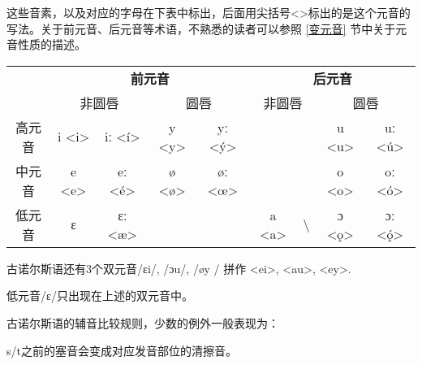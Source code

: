 
这些音素，以及对应的字母在下表中标出，后面用尖括号<>标出的是这个元音的写法。关于前元音、后元音等术语，不熟悉的读者可以参照 \ref{变元音} 节中关于元音性质的描述。

\begin{table}[H]
    \centering
    \begin{tabular}{@{}ccccccccc@{}}
        \toprule
               & \multicolumn{4}{c}{\textbf{前元音}} & \multicolumn{4}{c}{\textbf{后元音}}                                                                                                                                                                                 \\ \cmidrule(l){2-9}
               & \multicolumn{2}{c}{非圆唇}          & \multicolumn{2}{c}{圆唇}            & \multicolumn{2}{c}{非圆唇}   & \multicolumn{2}{c}{圆唇}                                                                                                                       \\ \cmidrule(l){2-9}
        高元音 & i \textless{}i\textgreater{}        & iː \textless{}í\textgreater{}       & y \textless{}y\textgreater{} & yː \textless{}ý\textgreater{} &                              &                  & u \textless{}u\textgreater{} & uː \textless{}ú\textgreater{} \\
        中元音 & e \textless{}e\textgreater{}        & eː \textless{}é\textgreater{}       & ø \textless{}ø\textgreater{} & øː \textless{}œ\textgreater{} &                              &                  & o \textless{}o\textgreater{} & oː \textless{}ó\textgreater{} \\
        低元音 & ɛ                                   & ɛː \textless{}æ\textgreater{}       &                              &                               & a \textless{}a\textgreater{} & \textbackslash{} & ɔ \textless{}ǫ\textgreater{} & ɔː \textless{}ǫ́\textgreater{} \\ \bottomrule
    \end{tabular}
\end{table}

古诺尔斯语还有3个双元音/ɛi/, /ɔu/, /øy / 拼作 <ei>, <au>, <ey>.

低元音/ɛ/只出现在上述的双元音中。

古诺尔斯语的辅音比较规则，少数的例外一般表现为：

\begin{info}
    s/t之前的塞音会变成对应发音部位的清擦音。\footnotemark
\end{info}

